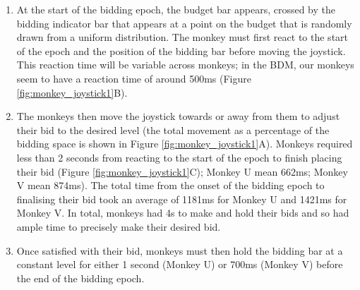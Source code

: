 \begin{enumerate}
    \item At the start of the bidding epoch, the budget bar appears, crossed by the bidding indicator bar that appears at a point on the budget that is randomly drawn from a uniform distribution. The monkey must first react to the start of the epoch and the position of the bidding bar before moving the joystick. This reaction time will be variable across monkeys; in the BDM, our monkeys seem to have a reaction time of around 500ms (Figure \ref{fig:monkey_joystick1}B).
    \item The monkeys then move the joystick towards or away from them to adjust their bid to the desired level (the total movement as a percentage of the bidding space is shown in Figure \ref{fig:monkey_joystick1}A). Monkeys  required less than 2 seconds from reacting to the start of the epoch to finish placing their bid (Figure \ref{fig:monkey_joystick1}C); Monkey U mean 662ms; Monkey V mean 874ms). The total time from the onset of the bidding epoch to finalising their bid took an average of 1181ms for Monkey U and 1421ms for Monkey V. In total, monkeys had 4s to make and hold their bids and so had ample time to precisely make their desired bid.
    \item Once satisfied with their bid, monkeys must then hold the bidding bar at a constant level for either 1 second (Monkey U) or 700ms (Monkey V) before the end of the bidding epoch.
\end{enumerate} 

